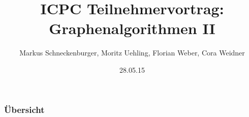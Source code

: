 \documentclass{beamer}
\title[Graphen II]{ICPC Teilnehmervortrag: Graphenalgorithmen II} %
\author{Markus Schneckenburger, Moritz Uehling, Florian Weber, Cora Weidner } %
\institute[UCLA] %
{
KIT\\ICPC-Teilnehmervortrag
}
\date{28.05.15} %
\begin{document}
\begin{frame}
\titlepage %
\end{frame}

\begin{frame}
\frametitle{Übersicht} 
\tableofcontents
\end{frame}

%





\end{document}
